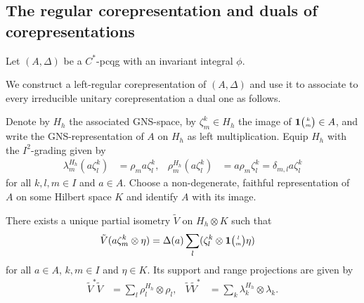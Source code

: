 \subsection{The regular  corepresentation and duals of corepresentations}

Let $(A,\Delta)$ be a $C^{*}$-pcqg with an invariant integral $\phi$.

We  construct a left-regular corepresentation of $(A,\Delta)$ and
use it to associate to every irreducible unitary corepresentation a
dual one as follows.

 
 Denote by $H_{h}$ the associated GNS-space, by $\zeta^k_m \in H_{h}$ the image of $\mathbf{1}{\tiny {\begin{pmatrix} k\\m\end{pmatrix}}}
 \in A$, and write the GNS-representation of $A$ on $H_{h}$ as left multiplication.   Equip
 $H_{h}$ with the $I^{2}$-grading given by
 \begin{align*}
   \lambda^{H_{h}}_{m}  (a\zeta^{k}_{l}) &=  \rho_{m}a \zeta^{k}_{l}, &
   \rho^{H_{h}}_{m} (a\zeta^{k}_{l}) &= a\rho_{m} \zeta^{k}_{l} = \delta_{m,l} a\zeta^{k}_{l}
 \end{align*}
 for all $k,l,m\in I$ and $a\in A$.
 Choose a non-degenerate, faithful representation of $A$ on some Hilbert space $K$ and identify $A$
 with its image.
 \begin{Lem}\label{lem:reg-corep-pi}
   There exists a unique partial isometry $\tilde V$ on $H_{h} \otimes
   K$ such
   that
   \begin{align} \label{eq:regular-corep-pi}
     \tilde V(a \zeta^k_m \otimes \eta) &=
     \Delta(a) \sum_{l}(\zeta^{k}_{l} \otimes \mathbf{1}{\tiny {\begin{pmatrix} l\\m\end{pmatrix}}}\eta)
   \end{align}
   for all $a\in A$, $k,m\in I$ and $\eta\in K$. Its support and range
   projections are given by
   \begin{align*}
     \tilde V^{*}\tilde V &= \sum_{l} \rho^{H_{h}}_{l} \otimes \rho_{l}, &
     \tilde V \tilde V^{*} &= \sum_{k} \lambda^{H_{h}}_{k} \otimes \lambda_{k}.
   \end{align*}
 \end{Lem}
